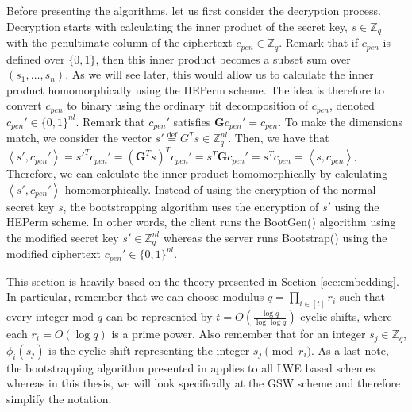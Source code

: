 Before presenting the algorithms, let us first consider the decryption process. Decryption starts with calculating the inner product of the secret key, $s \in \mathbb{Z}_q$ with the penultimate column of the ciphertext $c_{pen} \in \mathbb{Z}_q$. Remark that if $c_{pen}$ is defined over $\{0,1\}$, then this inner product becomes a subset sum over $(s_1, \dots, s_n)$. As we will see later, this would allow us to calculate the inner product homomorphically using the HEPerm scheme. The idea is therefore to convert $c_{pen}$ to binary using the ordinary bit decomposition of $c_{pen}$, denoted $c_{pen}' \in \{0,1\}^{nl}$. Remark that $c_{pen}'$ satisfies $\mathbf{G}c_{pen}' = c_{pen}$. To make the dimensions match, we consider the vector $s' \stackrel{\mathrm{def}}{=} G^T s \in \mathbb{Z}_q^{nl}$. Then, we have that $\left \langle s', c_{pen}' \right \rangle = s'^T c_{pen}' = (\mathbf{G}^T s)^T c_{pen}' = s^T \mathbf{G} c_{pen}' = s^T c_{pen} = \left \langle s,c_{pen} \right \rangle$. Therefore, we can calculate the inner product homomorphically by calculating $\left \langle s', c_{pen}' \right \rangle$ homomorphically. Instead of using the encryption of the normal secret key $s$, the bootstrapping algorithm uses the encryption of $s'$ using the HEPerm scheme. In other words, the client runs the BootGen() algorithm using the modified secret key $s' \in \mathbb{Z}_q^{nl}$ whereas the server runs Bootstrap() using the modified ciphertext $c_{pen}' \in \{0,1\}^{nl}$.

This section is heavily based on the theory presented in Section \ref{sec:embedding}. In particular, remember that we can choose modulus $q = \prod\limits_{i \in [t]}r_i$ such that every integer mod $q$ can be represented by $t = O(\frac{\log q}{\log \log q})$ cyclic shifts, where each $r_i = O(\log q)$ is a prime power. Also remember that for an integer $s_j \in \mathbb{Z}_q$, $\phi_i(s_j)$ is the cyclic shift representing the integer $s_j \pmod {r_i}$. As a last note, the bootstrapping algorithm presented in \cite{A-S-P-boot} applies to all LWE based schemes whereas in this thesis, we will look specifically at the GSW scheme and therefore simplify the notation.

